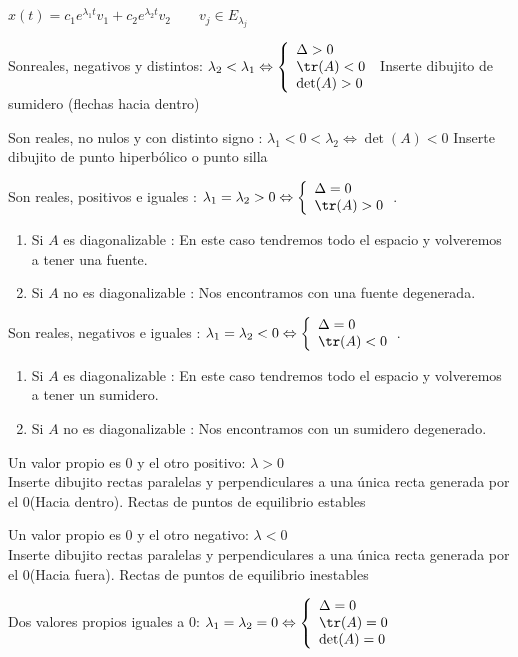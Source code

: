 $x(t)=c_1 e^{\lambda_1t}v_1+c_2 e^{\lambda_2t}v_2 \qquad v_j \in E_{\lambda_j}$

\begin{nlist}
  
\item Sonreales, negativos y distintos: $\lambda_2 < \lambda_1 \Leftrightarrow \left\{ \begin{array}{ll}\Delta > 0 \\ \tr(A) < 0 \\ \det(A)>0\end{array}\right.$
Inserte dibujito de sumidero (flechas hacia dentro)
\item Son reales, no nulos y con distinto signo : $\lambda_1 < 0 < \lambda_2 \Leftrightarrow \det(A)<0$
Inserte dibujito de punto hiperbólico o punto silla
\item Son reales, positivos e iguales : $\lambda_1=\lambda_2>0 \Leftrightarrow \left\{ \begin{array}{ll} \Delta = 0 \\ \tr(A)>0\end{array}\right.$.
  
\begin{enumerate}
\item Si $A$ es diagonalizable : En este caso tendremos todo el espacio y volveremos a tener una fuente.
\item Si $A$ no es diagonalizable : Nos encontramos con una fuente degenerada.
\end{enumerate}

\item Son reales, negativos e iguales : $\lambda_1=\lambda_2<0 \Leftrightarrow \left\{ \begin{array}{ll} \Delta = 0 \\ \tr(A)<0\end{array}\right.$.
  
\begin{enumerate}
\item Si $A$ es diagonalizable : En este caso tendremos todo el espacio y volveremos a tener un sumidero.
\item Si $A$ no es diagonalizable : Nos encontramos con un sumidero degenerado.
\end{enumerate}

\item Un valor propio es 0 y el otro positivo: $\lambda>0$ \\
Inserte dibujito rectas paralelas y perpendiculares a una única recta generada por el 0(Hacia dentro). Rectas  de puntos de equilibrio estables
\item Un valor propio es 0 y el otro negativo: $\lambda<0 $ \\
Inserte dibujito rectas paralelas y perpendiculares a una única recta generada por el 0(Hacia fuera). Rectas  de puntos de equilibrio inestables
\item Dos valores propios iguales a 0: $\lambda_1=\lambda_2=0 \Leftrightarrow \left\{ \begin{array}{ll}\Delta=0 \\ \tr(A)=0 \\ \det(A)=0\end{array}\right.$
  

\end{nlist}

